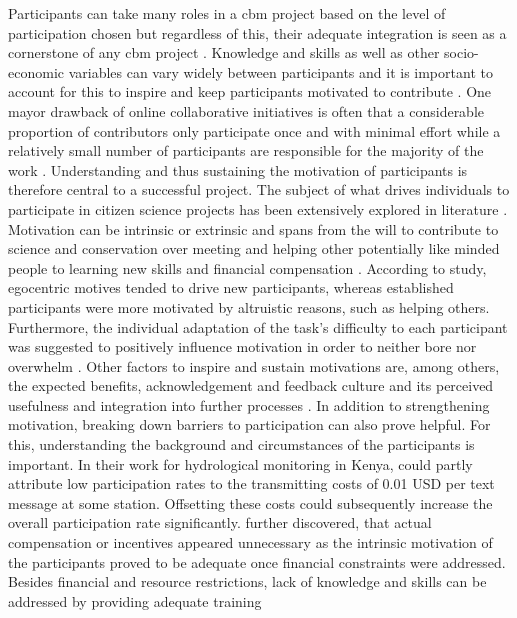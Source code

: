 {%
Participants can take many roles in a \acrshort*{cbm} project based on the level of participation chosen but regardless of this, their adequate integration is seen as a cornerstone of any \acrshort*{cbm} project \autocite{land-zandstraParticipantsCitizenScience2021}. Knowledge and skills as well as other socio-economic variables can vary widely between participants and it is important to account for this to inspire and keep participants motivated to contribute \autocite{minkmanCitizenScienceWater2015,whitelawEstablishingCanadianCommunity2003}. One mayor drawback of online collaborative initiatives is often that a considerable proportion of contributors only participate once and with minimal effort while a relatively small number of participants are responsible for the majority of the work \autocite{sauermannCrowdScienceUser2015}. Understanding and thus sustaining the motivation of participants is therefore central to a successful project. The subject of what drives individuals to participate in citizen science projects has been extensively explored in literature \autocite{land-zandstraParticipantsCitizenScience2021,minkmanCitizenScienceWater2015,mloza-bandaCrowdsensingSuccessfulWater2018,ruttenHowGetKeep2017,tipaldoCitizenScienceCommunitybased2017,walkerBenefitsNegativeImpacts2021a,walkerBenefitsNegativeImpacts2021}. Motivation can be intrinsic or extrinsic and spans from the will to contribute to science and conservation over meeting and helping other potentially like minded people to learning new skills and financial compensation \autocite{minkmanCitizenScienceWater2015,rotmanDynamicChangesMotivation2012 ruttenHowGetKeep2017}. According to \autocite{rotmanDynamicChangesMotivation2012}  study, egocentric motives tended to drive new participants, whereas established participants were more motivated by altruistic reasons, such as helping others. Furthermore, the individual adaptation of the task's difficulty to each participant was suggested to positively influence motivation in order to neither bore nor overwhelm \autocite{minkmanCitizenScienceWater2015}. Other factors to inspire and sustain motivations are, among others, the expected benefits, acknowledgement and feedback culture and its perceived usefulness and integration into further processes \autocite{land-zandstraParticipantsCitizenScience2021,minkmanCitizenScienceWater2015,pettiboneCitizenScienceAll2016}. In addition to strengthening motivation, breaking down barriers to participation can also prove helpful. For this, understanding the background and circumstances of the participants is important. In their work for hydrological monitoring in Kenya, \autocite{weeserCitizenSciencePioneers2018a} could partly attribute low participation rates to the transmitting costs of 0.01 USD per text message at some station. Offsetting these costs could subsequently increase the overall participation rate significantly. \autocite{weeserCitizenSciencePioneers2018a} further discovered, that actual compensation or incentives appeared unnecessary as the intrinsic motivation of the participants proved to be adequate once financial constraints were addressed. Besides financial and resource restrictions, lack of knowledge and skills can be addressed by providing adequate training }
